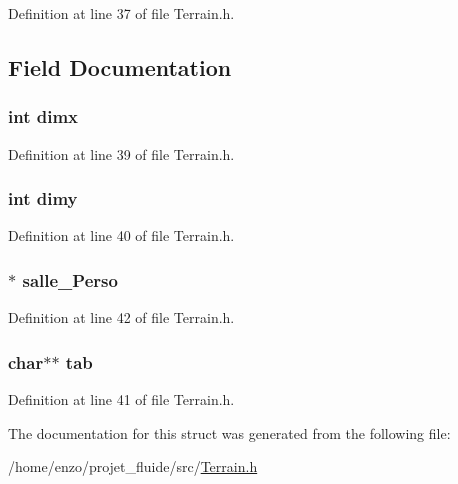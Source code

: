 Definition at line 37 of file Terrain.\-h.



\subsection{Field Documentation}
\hypertarget{struct_terrain_a8b0f6ae031a507c3ffb7bf0eec290d46}{
\subsubsection[{dimx}]{\setlength{\rightskip}{0pt plus 5cm}int dimx}}\label{struct_terrain_a8b0f6ae031a507c3ffb7bf0eec290d46}


Definition at line 39 of file Terrain.\-h.

\hypertarget{struct_terrain_a3a072d6ef9c51d085b44eac70f2edff6}{
\subsubsection[{dimy}]{\setlength{\rightskip}{0pt plus 5cm}int dimy}}\label{struct_terrain_a3a072d6ef9c51d085b44eac70f2edff6}


Definition at line 40 of file Terrain.\-h.

\hypertarget{struct_terrain_ad00556a521b6c4ae8221f3c9e361cc03}{
\subsubsection[{salle\-\_\-\-Perso}]{$\ast$ salle\-\_\-\-Perso}}\label{struct_terrain_ad00556a521b6c4ae8221f3c9e361cc03}


Definition at line 42 of file Terrain.\-h.

\hypertarget{struct_terrain_a095ef5f32e2dd3c36f801fc514372ee3}{
\subsubsection[{tab}]{\setlength{\rightskip}{0pt plus 5cm}char$\ast$$\ast$ tab}}\label{struct_terrain_a095ef5f32e2dd3c36f801fc514372ee3}


Definition at line 41 of file Terrain.\-h.



The documentation for this struct was generated from the following file\-:\begin{DoxyCompactItemize}
\item 
/home/enzo/projet\-\_\-fluide/src/\hyperlink{_terrain_8h}{Terrain.\-h}\end{DoxyCompactItemize}
